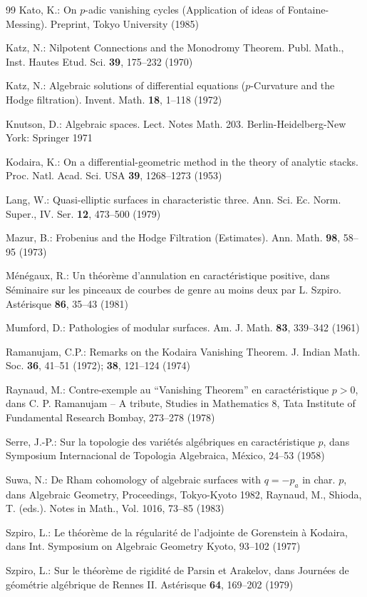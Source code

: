 \documentclass[12pt,a4paper]{article}
\theoremstyle{plain}
\theoremstyle{definition}
\theoremstyle{remark}
\begin{document}
\begin{thebibliography}{99}
 Kato, K.: On $p$-adic vanishing cycles (Application of ideas of Fontaine-Messing). Preprint, Tokyo University (1985)

 Katz, N.: Nilpotent Connections and the Monodromy Theorem. Publ. Math., Inst. Hautes Etud. Sci. \textbf{39}, 175--232 (1970)

 Katz, N.: Algebraic solutions of differential equations ($p$-Curvature and the Hodge filtration). Invent. Math. \textbf{18}, 1--118 (1972)

 Knutson, D.: Algebraic spaces. Lect. Notes Math. 203. Berlin-Heidelberg-New York: Springer 1971

 Kodaira, K.: On a differential-geometric method in the theory of analytic stacks. Proc. Natl. Acad. Sci. USA \textbf{39}, 1268--1273 (1953)

 Lang, W.: Quasi-elliptic surfaces in characteristic three. Ann. Sci. Ec. Norm. Super., IV. Ser. \textbf{12}, 473--500 (1979)

 Mazur, B.: Frobenius and the Hodge Filtration (Estimates). Ann. Math. \textbf{98}, 58--95 (1973)

 M\'en\'egaux, R.: Un th\'eor\`eme d'annulation en caract\'eristique positive, dans S\'eminaire sur les pinceaux de courbes de genre au moins deux par L. Szpiro. Ast\'erisque \textbf{86}, 35--43 (1981)

 Mumford, D.: Pathologies of modular surfaces. Am. J. Math. \textbf{83}, 339--342 (1961)

 Ramanujam, C.P.: Remarks on the Kodaira Vanishing Theorem. J. Indian Math. Soc. \textbf{36}, 41--51 (1972); \textbf{38}, 121--124 (1974)

 Raynaud, M.: Contre-exemple au ``Vanishing Theorem'' en caract\'eristique $p > 0$, dans C. P. Ramanujam -- A tribute, Studies in Mathematics 8, Tata Institute of Fundamental Research Bombay, 273--278 (1978)

 Serre, J.-P.: Sur la topologie des vari\'et\'es alg\'ebriques en caract\'eristique $p$, dans Symposium Internacional de Topologia Algebraica, M\'exico, 24--53 (1958)

 Suwa, N.: De Rham cohomology of algebraic surfaces with $q = -p_a$ in char. $p$, dans Algebraic Geometry, Proceedings, Tokyo-Kyoto 1982, Raynaud, M., Shioda, T. (eds.). Notes in Math., Vol. 1016, 73--85 (1983)

 Szpiro, L.: Le th\'eor\`eme de la r\'egularit\'e de l'adjointe de Gorenstein \`a Kodaira, dans Int. Symposium on Algebraic Geometry Kyoto, 93--102 (1977)

 Szpiro, L.: Sur le th\'eor\`eme de rigidit\'e de Parsin et Arakelov, dans Journ\'ees de g\'eom\'etrie alg\'ebrique de Rennes II. Ast\'erisque \textbf{64}, 169--202 (1979)

\end{thebibliography}
\end{document}

